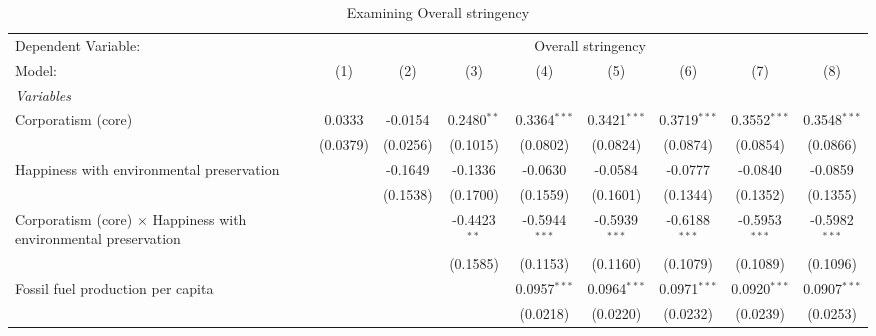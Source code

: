 
\begin{table}[htbp]
   \caption{Examining Overall stringency}
   \centering
   \begin{tabular}{lcccccccc}
      \tabularnewline \midrule \midrule
      Dependent Variable: & \multicolumn{8}{c}{Overall stringency}\\
      Model:                                                                 & (1)      & (2)      & (3)            & (4)             & (5)             & (6)             & (7)                   & (8)\\  
      \midrule
      \emph{Variables}\\
      Corporatism (core)                                                     & 0.0333   & -0.0154  & 0.2480$^{**}$  & 0.3364$^{***}$  & 0.3421$^{***}$  & 0.3719$^{***}$  & 0.3552$^{***}$        & 0.3548$^{***}$\\   
                                                                             & (0.0379) & (0.0256) & (0.1015)       & (0.0802)        & (0.0824)        & (0.0874)        & (0.0854)              & (0.0866)\\   
      Happiness with environmental preservation                              &          & -0.1649  & -0.1336        & -0.0630         & -0.0584         & -0.0777         & -0.0840               & -0.0859\\   
                                                                             &          & (0.1538) & (0.1700)       & (0.1559)        & (0.1601)        & (0.1344)        & (0.1352)              & (0.1355)\\   
      Corporatism (core) $\times$ Happiness with environmental preservation  &          &          & -0.4423$^{**}$ & -0.5944$^{***}$ & -0.5939$^{***}$ & -0.6188$^{***}$ & -0.5953$^{***}$       & -0.5982$^{***}$\\   
                                                                             &          &          & (0.1585)       & (0.1153)        & (0.1160)        & (0.1079)        & (0.1089)              & (0.1096)\\   
      Fossil fuel production per capita                                      &          &          &                & 0.0957$^{***}$  & 0.0964$^{***}$  & 0.0971$^{***}$  & 0.0920$^{***}$        & 0.0907$^{***}$\\   
                                                                             &          &          &                & (0.0218)        & (0.0220)        & (0.0232)        & (0.0239)              & (0.0253)\\   

\end{tabular}
\end{table}
